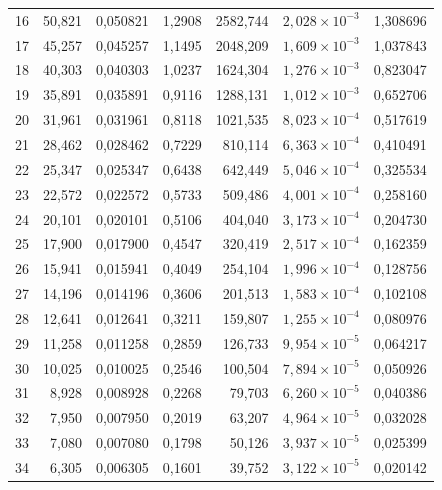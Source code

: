\begin{longtable}{crrrrrr}
16 &     50,821 &   0,050821 &     1,2908 &   2582,744 &  $2{,}028\times 10^{-3}$ &   1,308696 \\
17 &     45,257 &   0,045257 &     1,1495 &   2048,209 &  $1{,}609\times 10^{-3}$ &   1,037843 \\
18 &     40,303 &   0,040303 &     1,0237 &   1624,304 &  $1{,}276\times 10^{-3}$ &   0,823047 \\
19 &     35,891 &   0,035891 &     0,9116 &   1288,131 &  $1{,}012\times 10^{-3}$ &   0,652706 \\
20 &     31,961 &   0,031961 &     0,8118 &   1021,535 &  $8{,}023\times 10^{-4}$ &   0,517619 \\
21 &     28,462 &   0,028462 &     0,7229 &    810,114 &  $6{,}363\times 10^{-4}$ &   0,410491 \\
22 &     25,347 &   0,025347 &     0,6438 &    642,449 &  $5{,}046\times 10^{-4}$ &   0,325534 \\
23 &     22,572 &   0,022572 &     0,5733 &    509,486 &  $4{,}001\times 10^{-4}$ &   0,258160 \\
24 &     20,101 &   0,020101 &     0,5106 &    404,040 &  $3{,}173\times 10^{-4}$ &   0,204730 \\
25 &     17,900 &   0,017900 &     0,4547 &    320,419 &  $2{,}517\times 10^{-4}$ &   0,162359 \\
26 &     15,941 &   0,015941 &     0,4049 &    254,104 &  $1{,}996\times 10^{-4}$ &   0,128756 \\
27 &     14,196 &   0,014196 &     0,3606 &    201,513 &  $1{,}583\times 10^{-4}$ &   0,102108 \\
28 &     12,641 &   0,012641 &     0,3211 &    159,807 &  $1{,}255\times 10^{-4}$ &   0,080976 \\
29 &     11,258 &   0,011258 &     0,2859 &    126,733 &  $9{,}954\times 10^{-5}$ &   0,064217 \\
30 &     10,025 &   0,010025 &     0,2546 &    100,504 &  $7{,}894\times 10^{-5}$ &   0,050926 \\
31 &      8,928 &   0,008928 &     0,2268 &     79,703 &  $6{,}260\times 10^{-5}$ &   0,040386 \\
32 &      7,950 &   0,007950 &     0,2019 &     63,207 &  $4{,}964\times 10^{-5}$ &   0,032028 \\
33 &      7,080 &   0,007080 &     0,1798 &     50,126 &  $3{,}937\times 10^{-5}$ &   0,025399 \\
34 &      6,305 &   0,006305 &     0,1601 &     39,752 &  $3{,}122\times 10^{-5}$ &   0,020142 \\

\end{longtable}
